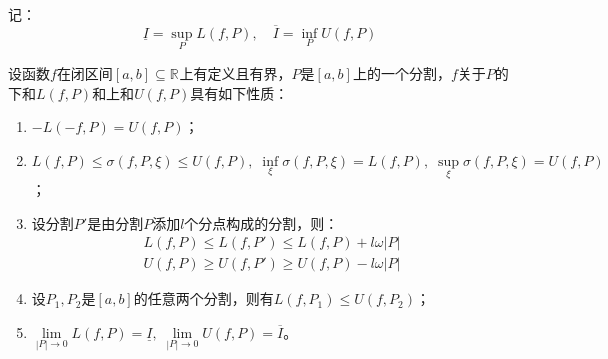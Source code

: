 \begin{definition}
	记：
	\begin{equation*}
		\underline{I}=\sup_PL(f,P),\quad\overline{I}=\inf_PU(f,P)
	\end{equation*}
\end{definition}
\begin{property}\label{prop:DarbouxSum}
	设函数$f$在闭区间$[a,b]\subseteq\mathbb{R}^{}$上有定义且有界，$P$是$[a,b]$上的一个分割，$f$关于$P$的下和$L(f,P)$和上和$U(f,P)$具有如下性质：
	\begin{enumerate}
		\item $-L(-f,P)=U(f,P)$；
		\item $L(f,P)\leqslant\sigma(f,P,\xi)\leqslant U(f,P),\;\inf\limits_{\xi}\sigma(f,P,\xi)=L(f,P),\;\sup\limits_{\xi}\sigma(f,P,\xi)=U(f,P)$；
		\item 设分割$P'$是由分割$P$添加$l$个分点构成的分割，则：
		\begin{align*}
			L(f,P)\leqslant L(f,P')\leqslant L(f,P)+l\omega|P| \\
			U(f,P)\geqslant U(f,P')\geqslant U(f,P)-l\omega|P|
		\end{align*}
		\item 设$P_1,P_2$是$[a,b]$的任意两个分割，则有$L(f,P_1)\leqslant U(f,P_2)$；
		\item $\lim\limits_{|P|\to0}L(f,P)=\underline{I},\;\lim\limits_{|P|\to0}U(f,P)=\overline{I}$。
	\end{enumerate}
\end{property}
